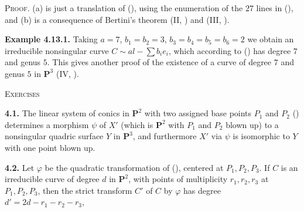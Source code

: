 {\smallskip
\noindent\textsc{Proof.} (a) is just a translation of (), using the enumeration of the $27$ lines in (), and (b) is a consequence of Bertini's theorem (II, ) and (III, ).

\medskip
\noindent\hypertarget{result-V-4.13.1}{}\textbf{Example 4.13.1.} Taking $a=7$, $b_1=b_2=3$, $b_3=b_4=b_5=b_6=2$ we obtain an irreducible nonsingular curve $C\sim al-\sum b_ie_i$, which according to () has degree $7$ and genus $5$. This gives another proof of the existence of a curve of degree $7$ and genus $5$ in $\mathbf P^3$ (IV, ).

\medskip
\noindent\textsc{Exercises}

\smallskip
\noindent\hypertarget{ex-V-4.1}{}\textbf{4.1.} The linear system of conics in $\mathbf P^2$ with two assigned base points $P_1$ and $P_2$ () determines a morphism $\psi$ of $X'$ (which is $\mathbf P^2$ with $P_1$ and $P_2$ blown up) to a nonsingular quadric surface $Y$ in $\mathbf P^3$, and furthermore $X'$ via $\psi$ is isomorphic to $Y$ with one point blown up.

\smallskip
\noindent\hypertarget{ex-V-4.2}{}\textbf{4.2.} Let $\varphi$ be the quadratic transformation of (), centered at $P_1,P_2,P_3$. If $C$ is an irreducible curve of degree $d$ in $\mathbf P^2$, with points of multiplicity $r_1,r_2,r_3$ at $P_1,P_2,P_3$, then the strict transform $C'$ of $C$ by $\varphi$ has degree $d'=2d-r_1-r_2-r_3$,}
